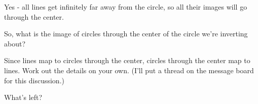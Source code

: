 




Yes - all lines get infinitely far away from the circle, so all their images will go through the center.

So, what is the image of circles through the center of the circle we're inverting about?







Since lines map to circles through the center, circles through the center map to lines.  Work out the details on your own. (I'll put a thread on the message board for this discussion.)

What's left?






